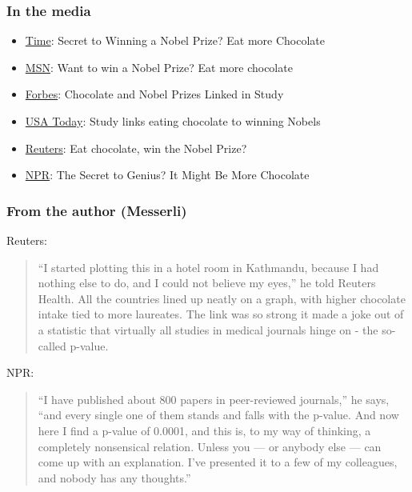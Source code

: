 \begin{frame}
\frametitle{In the media}
\begin{itemize}
    \item
    \href{http://healthland.time.com/2012/10/12/can-eating-chocolate-help-you-win-a-nobel-prize/}{Time}: Secret to Winning a Nobel Prize?  Eat more Chocolate
    \item
    \href{http://now.msn.com/chocolate-consumption-per-capita-linked-to-number-of-nobel-prize-wins}{MSN}: Want to win a Nobel Prize? Eat more chocolate
    \item
    \href{http://www.forbes.com/sites/larryhusten/2012/10/10/chocolate-and-nobel-prizes-linked-in-study/}{Forbes}: Chocolate and Nobel Prizes Linked in Study
    \item
    \href{http://www.usatoday.com/story/news/nation/2012/10/10/nobel-prizes-chocolate/1625403/}{USA Today}: Study links eating chocolate to winning Nobels
    \item
    \href{http://www.reuters.com/article/2012/10/10/us-eat-chocolate-win-the-nobel-prize-idUSBRE8991MS20121010}{Reuters}: Eat chocolate, win the Nobel Prize?
    \item
    \href{http://www.npr.org/blogs/thesalt/2012/10/12/162733830/the-secret-to-genius-it-might-be-more-chocolate}{NPR}: The Secret to Genius?  It Might Be More Chocolate
\end{itemize}
\end{frame}


\begin{frame}
\frametitle{From the author (Messerli)}
Reuters:
\footnotesize{
\begin{quote}
    ``I started plotting this in a hotel room in Kathmandu, because I had nothing else to do, and I could not believe my eyes,'' he told Reuters Health. All the countries lined up neatly on a graph, with higher chocolate intake tied to more laureates.  The link was so strong it made a joke out of a statistic that virtually all studies in medical journals hinge on - the so-called p-value.
\end{quote}}
NPR:
\footnotesize{
\begin{quote}
    ``I have published about 800 papers in peer-reviewed journals,'' he says, ``and every single one of them stands and falls with the p-value. And now here I find a p-value of 0.0001, and this is, to my way of thinking, a completely nonsensical relation. Unless you — or anybody else — can come up with an explanation. I've presented it to a few of my colleagues, and nobody has any thoughts.''
\end{quote}}
\end{frame}




